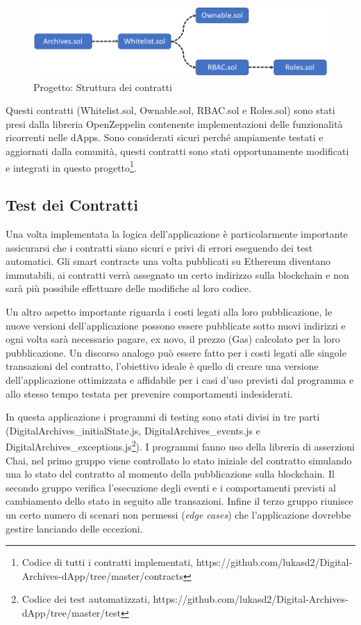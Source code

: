 \begin{figure}[H]
\centering
\includegraphics[width=1\textwidth]{immagini/contractStructure.png}
\caption{Progetto: Struttura dei contratti}
\label{fig:contractStructure}
\end{figure}

Questi contratti (Whitelist.sol, Ownable.sol, RBAC.sol e Roles.sol) sono stati presi dalla libreria OpenZeppelin contenente implementazioni delle funzionalità ricorrenti nelle dApps. Sono considerati sicuri perché ampiamente testati e aggiornati dalla comunità, questi contratti sono stati opportunamente modificati e integrati in questo progetto{\footnote{Codice di tutti i contratti implementati, https://github.com/lukasd2/Digital-Archives-dApp/tree/master/contracts}}.

\subsection{Test dei Contratti}

Una volta implementata la logica dell'applicazione è particolarmente importante assicurarsi che i contratti siano sicuri e privi di errori eseguendo dei test automatici. Gli smart contracts una volta pubblicati su Ethereum diventano immutabili, ai contratti verrà assegnato un certo indirizzo sulla blockchain e non sarà più possibile effettuare delle modifiche al loro codice. 

Un altro aspetto importante riguarda i costi legati alla loro pubblicazione, le nuove versioni dell'applicazione possono essere pubblicate sotto nuovi indirizzi e ogni volta sarà necessario pagare, ex novo, il prezzo (Gas) calcolato per la loro pubblicazione. Un discorso analogo può essere fatto per i costi legati alle singole transazioni del contratto, l'obiettivo ideale è quello di creare una versione dell'applicazione ottimizzata e affidabile per i casi d'uso previsti dal programma e allo stesso tempo testata per prevenire comportamenti indesiderati.

In questa applicazione i programmi di testing sono stati divisi in tre parti (DigitalArchives\_initialState.js, DigitalArchives\_events.js e DigitalArchives\_exceptions.js{\footnote{Codice dei test automatizzati, https://github.com/lukasd2/Digital-Archives-dApp/tree/master/test}}). I programmi fanno uso della libreria di asserzioni Chai, nel primo gruppo viene controllato lo stato iniziale del contratto simulando una lo stato del contratto al momento della pubblicazione sulla blockchain. Il secondo gruppo verifica l'esecuzione degli eventi e i comportamenti previsti al cambiamento dello stato in seguito alle transazioni. Infine il terzo gruppo riunisce un certo numero di scenari non permessi (\emph{edge cases}) che l'applicazione dovrebbe gestire lanciando delle eccezioni.

